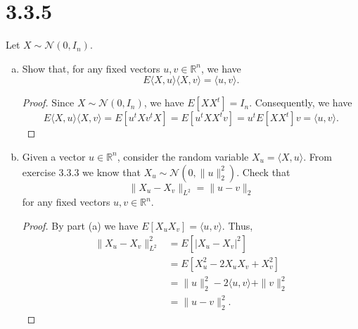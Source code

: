 \documentclass[11pt,letterpaper]{report}
\newcommand{\reals}{\mathbb{R}}
\newcommand{\mcal}[1]{\mathcal{#1}}
\newcommand{\Lp}[2]{\big\|{#1}\big\|_{L^{#2}}}
\begin{document}
\section*{3.3.5}
Let $X\sim \mcal{N}(0, I_n)$.
\begin{enumerate}[(a)]
	\item Show that, for any fixed vectors $u,v\in \reals^n$, we have
	\[
	E\langle X, u\rangle \langle X, v\rangle = \langle u, v\rangle.
	\]
	\begin{proof}
		Since $X\sim \mcal{N}(0, I_n)$, we have $E[XX^t] = I_n$. Consequently, we have
		\[
		E\langle X, u\rangle \langle X, v\rangle = E[u^tXv^tX ] = E[u^tXX^tv] = u^tE[XX^t]v = \langle u, v\rangle.
		\]
	\end{proof}

	\item Given a vector $u\in \reals^n$, consider the random variable $X_u = \langle X, u\rangle$. From exercise 3.3.3 we know that $X_u \sim \mcal{N}(0, \|u\|_2^2)$. Check that
	\[
	\Lp{X_u - X_v}{2} = \|u-v\|_2
	\]
	for any fixed vectors $u, v\in \reals^n$.
	\begin{proof}
		By part (a) we have $E[X_uX_v] = \langle u, v\rangle$. Thus,
		\begin{align*}
			\Lp{X_u - X_v}{2}^2 &= E[|X_u  -X_v|^2]\\
			&= E[X_u^2 - 2X_uX_v + X_v^2]\\
			&= \|u\|_2^2 - 2\langle u, v\rangle + \|v\|_2^2\\
			&= \|u-v\|_2^2.
		\end{align*}
	\end{proof}
\end{enumerate}
\end{document}
